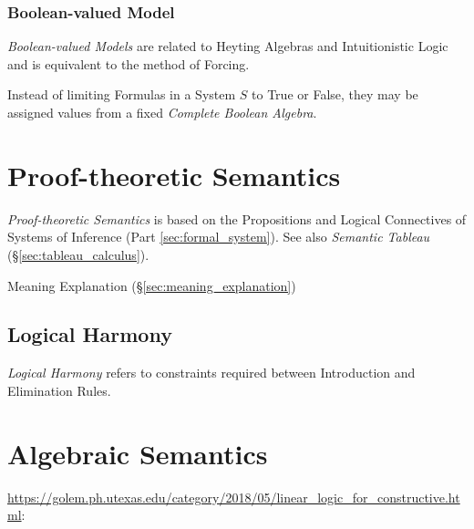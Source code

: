 \subsubsection{Boolean-valued Model}\label{sec:boolean_model}

\emph{Boolean-valued Models} are related to Heyting Algebras and
Intuitionistic Logic and is equivalent to the method of Forcing.

Instead of limiting Formulas in a System $S$ to True or False, they
may be assigned values from a fixed \emph{Complete Boolean Algebra}.



\section{Proof-theoretic Semantics}\label{sec:proof_semantics}

\emph{Proof-theoretic Semantics} is based on the Propositions and
Logical Connectives of Systems of Inference (Part
\ref{sec:formal_system}). See also \emph{Semantic Tableau}
(\S\ref{sec:tableau_calculus}).

Meaning Explanation (\S\ref{sec:meaning_explanation})



\subsection{Logical Harmony} \label{sec:logical_harmony}

\emph{Logical Harmony} refers to constraints required between
Introduction and Elimination Rules.



\section{Algebraic Semantics}\label{sec:algebraic_semantics}

\url{https://golem.ph.utexas.edu/category/2018/05/linear_logic_for_constructive.html}:

